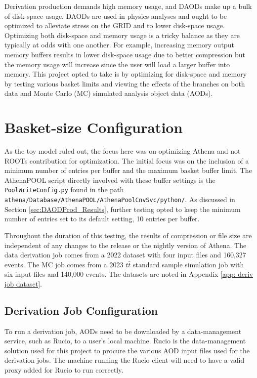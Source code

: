 Derivation production demands high memory usage, and DAODs make up a bulk of disk-space usage. 
DAODs are used in physics analyses and ought to be optimized to alleviate stress on the GRID and to lower disk-space usage. 
Optimizing both disk-space and memory usage is a tricky balance as they are typically at odds with one another. 
For example, increasing memory output memory buffers results in lower disk-space usage due to better compression but the memory usage will increase since the user will load a larger buffer into memory. 
This project opted to take is by optimizing for disk-space and memory by testing various basket limits and viewing the effects of the branches on both data and Monte Carlo (MC) simulated analysis object data (AODs).

\section{Basket-size Configuration}
\label{sec:DAODProd_Analysis}

As the toy model ruled out, the focus here was on optimizing Athena and not ROOTs contribution for optimization.
The initial focus was on the inclusion of a minimum number of entries per buffer and the maximum basket buffer limit.
The AthenaPOOL script directly involved with these buffer settings is the \verb|PoolWriteConfig.py| found in the path \verb|athena/Database/AthenaPOOL/AthenaPoolCnvSvc/python/|.
As discussed in Section \ref{sec:DAODProd_Results}, further testing opted to keep the minimum number of entries set to its default setting, 10 entries per buffer. 

Throughout the duration of this testing, the results of compression or file size are independent of any changes to the release or the nightly version of Athena.  
The data derivation job comes from a 2022 dataset with four input files and 160,327 events. 
The MC job comes from a 2023 $t\bar{t}$ standard sample simulation job with six input files and 140,000 events. 
The datasets are noted in Appendix \ref{app: deriv job dataset}.

\subsection{Derivation Job Configuration}
To run a derivation job, AODs need to be downloaded by a data-management service, such as Rucio, to a user's local machine.\cite{RUCIO_citation} 
Rucio is the data-management solution used for this project to procure the various AOD input files used for the derivation jobs.
The machine running the Rucio client will need to have a valid proxy added for Rucio to run correctly.  

